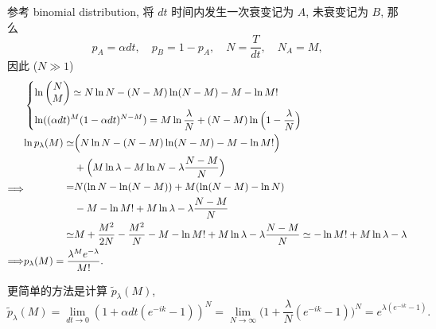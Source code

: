 \begin{itemize}
	\begin{tcolorbox}[title=calculation:]
		参考 binomial distribution, 将 $dt$ 时间内发生一次衰变记为 $A$, 未衰变记为 $B$, 那么
		\begin{equation}
			p_A = \alpha dt, \quad p_B = 1 - p_A, \quad N = \frac{T}{dt}, \quad N_A = M,
		\end{equation}
		因此 ($N \gg 1$)
		\begin{align}
			& \begin{dcases}
				\ln \begin{pmatrix}
					N \\
					M
				\end{pmatrix} \simeq N \ln N - (N - M) \ln(N - M) - M - \ln M! \\
				\ln((\alpha dt)^M (1 - \alpha dt)^{N - M}) = M \ln \frac{\lambda}{N} + (N - M) \ln \Big( 1 - \frac{\lambda}{N} \Big)
			\end{dcases} \notag \\
			\Longrightarrow & \begin{aligned}
				\ln p_\lambda(M) \simeq& \Big( N \ln N - (N - M) \ln(N - M) - M - \ln M! \Big) \\
				& + \Big( M \ln \lambda - M \ln N - \lambda \frac{N - M}{N} \Big) \\
				=& N (\ln N - \ln(N - M)) + M (\ln(N - M) - \ln N) \\
				& - M - \ln M! + M \ln \lambda - \lambda \frac{N - M}{N} \\
				\simeq& M + \frac{M^2}{2 N} - \frac{M^2}{N} - M - \ln M! + M \ln \lambda - \lambda \frac{N - M}{N} \simeq - \ln M! + M \ln \lambda - \lambda
			\end{aligned} \notag \\
			\Longrightarrow & p_\lambda(M) = \frac{\lambda^M e^{- \lambda}}{M!}.
		\end{align}
		
		更简单的方法是计算 $\tilde{p}_\lambda(M)$,
		\begin{equation}
			\tilde{p}_\lambda(M) = \lim_{dt \rightarrow 0} (1 + \alpha dt (e^{- i k} - 1))^N = \lim_{N \rightarrow \infty} \Big( 1 + \frac{\lambda}{N} (e^{- i k} - 1) \Big)^N = e^{\lambda (e^{- i k} - 1)}.
		\end{equation}
	\end{tcolorbox}
\end{itemize}

